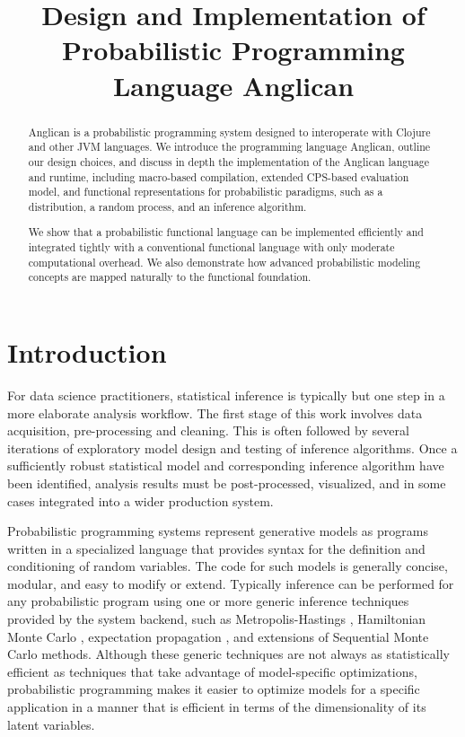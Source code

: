 \documentclass[preprint]{sigplanconf}
\title{Design and Implementation of Probabilistic Programming Language Anglican}
\begin{document}
\maketitle

\begin{abstract}
    Anglican is a probabilistic programming system designed to interoperate
    with Clojure and other JVM languages. We introduce the
	programming language Anglican, outline our design choices,
	and discuss in depth the implementation of the Anglican language
	and runtime, including macro-based compilation, extended
	CPS-based evaluation model, and functional representations for
	probabilistic paradigms, such as a distribution,
	a random process, and an inference algorithm.

	We show that a probabilistic functional language can be
	implemented efficiently and integrated tightly with a
	conventional functional language with only moderate
	computational overhead. We also demonstrate how advanced
	probabilistic modeling concepts are mapped naturally
	to the functional foundation.
\end{abstract}

\section{Introduction}
For data science practitioners, statistical inference is typically
but one step in a more elaborate analysis workflow. The first stage
of this work involves data acquisition, pre-processing and cleaning.
This is often followed by several iterations of exploratory model
design and testing of inference algorithms. Once a sufficiently
robust statistical model and corresponding inference algorithm have
been identified, analysis results must be post-processed, visualized,
and in some cases integrated into a wider production system.

Probabilistic programming systems \cite{GMR+08,MSP14,WVM14,GS15}
represent generative models as programs written in a specialized
language that provides syntax for the definition and conditioning of
random variables. The code for such models is generally concise,
modular, and easy to modify or extend. Typically inference can be
performed for any probabilistic program using one or more generic
inference techniques provided by the system backend, such as
Metropolis-Hastings \cite{WSG11,MSP14,YHG14}, Hamiltonian Monte Carlo
\cite{SDT04}, expectation propagation \cite{MWG+10}, and extensions
of Sequential Monte Carlo \cite{WVM14,MYM+15,PWD+14} methods.
Although these generic techniques are not always as statistically
efficient as techniques that take advantage of model-specific
optimizations, probabilistic programming makes it easier to optimize
models for a specific application in a manner that is efficient in
terms of the dimensionality of its latent variables.
\end{document}
